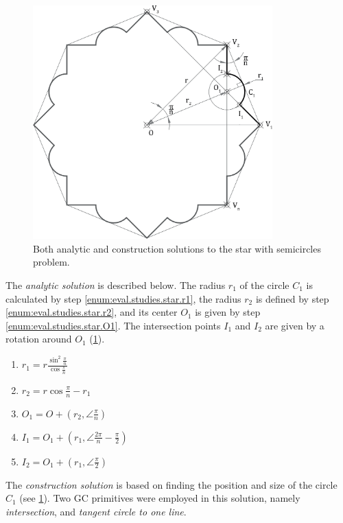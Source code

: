 \begin{figure}[htb]
  \centering
  \includegraphics[height=9cm]{fig/star-solution}
  \caption[Star with semicircles problem solution]{ Both analytic and
    construction solutions to the star with semicircles problem.}%
  \label{fig:eval.studies.star.sol}
\end{figure}

The \textit{analytic solution} is described below.  The radius $r_1$ of the
circle $C_1$ is calculated by step \ref{enum:eval.studies.star.r1}, the radius
$r_2$ is defined by step \ref{enum:eval.studies.star.r2}, and its center $O_1$
is given by step \ref{enum:eval.studies.star.O1}.  The intersection points $I_1$
and $I_2$ are given by a rotation around $O_1$
(\cref{fig:eval.studies.star.sol}).

\begin{enumerate}
  \item $r_1 = r\frac{\sin^2\frac{\pi}{n}}{\cos\frac{\pi}{n}}$
  \label{enum:eval.studies.star.r1}
  \item $r_2 = r\cos\frac{\pi}{n} - r_1$
  \label{enum:eval.studies.star.r2}
  \item $O_1 = O + \left(r_2, \angle\frac{\pi}{n}\right)$
  \label{enum:eval.studies.star.O1}
  \item $I_1 = O_1 + \left(r_1, \angle\frac{2\pi}{n} - \frac{\pi}{2}\right)$
  \item $I_2 = O_1 + \left(r_1, \angle\frac{\pi}{2}\right)$
\end{enumerate}

The \textit{construction solution} is based on finding the position and size of
the circle $C_1$ (see \cref{fig:eval.studies.star.sol}).  Two \ac{GC}
primitives were employed in this solution, namely \textit{intersection}, and
\textit{tangent circle to one line}.

